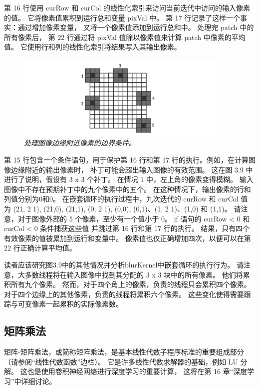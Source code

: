 第 16 行使用 curRow 和 curCol 的线性化索引来访问当前迭代中访问的输入像素的值。 
它将像素值累积到运行总和变量 pixVal 中。 第 17 行记录了这样一个事实：通过增加像素变量，
又将一个像素值添加到运行总和中。 处理完 patch 中的所有像素后，
第 22 行通过将 pixVal 值除以像素值来计算 patch 中像素的平均值。 它使用行和列的线性化索引将结果写入其输出像素。

\begin{figure}[H]
	\centering
	\includegraphics[width=0.9\textwidth]{figs/F3.9.png}
	\caption{\textit{处理图像边缘附近像素的边界条件。}}
\end{figure}

第 15 行包含一个条件语句，用于保护第 16 行和第 17 行的执行。例如，在计算图像边缘附近的输出像素时，
补丁可能会超出输入图像的有效范围。 这在图 3.9 中进行了说明，假设有 3 x 3 个补丁。 在情况 1 中，左上角的像素变得模糊。 
输入图像中不存在预期补丁中的九个像素中的五个。 在这种情况下，输出像素的行和列值分别为0和0。 
在嵌套循环的执行过程中，九次迭代的 curRow 和 curCol 值
为 (21, 2 1), (21,0), (21,1), (0, 2 1), (0,0), (0,1)、(1, 2 1)、(1,0) 和 (1,1)。 
请注意，对于图像外部的 5 个像素，至少有一个值小于 0。 if 语句的 curRow < 0 和 curCol < 0 条件捕获这些值
并跳过第 16 行和第 17 行的执行。 结果，只有四个有效像素的值被累加到运行和变量中。 
像素值也仅正确增加四次，以便可以在第 22 行正确计算平均值。

读者应该研究图3.9中的其他情况并分析blurKernel中嵌套循环的执行行为。 
请注意，大多数线程将在输入图像中找到其分配的 3 x 3 块中的所有像素。 他们将累积所有九个像素。 
然而，对于四个角上的像素，负责的线程只会累积四个像素。 对于四个边缘上的其他像素，负责的线程将累积六个像素。 
这些变化使得需要跟踪与可变像素一起累积的实际像素数。

\subsection{矩阵乘法}
矩阵-矩阵乘法，或简称矩阵乘法，是基本线性代数子程序标准的重要组成部分（请参阅“线性代数函数”边栏）。 
它是许多线性代数求解器的基础，例如 LU 分解。 这也是使用卷积神经网络进行深度学习的重要计算，
这将在第 16 章“深度学习”中详细讨论。

